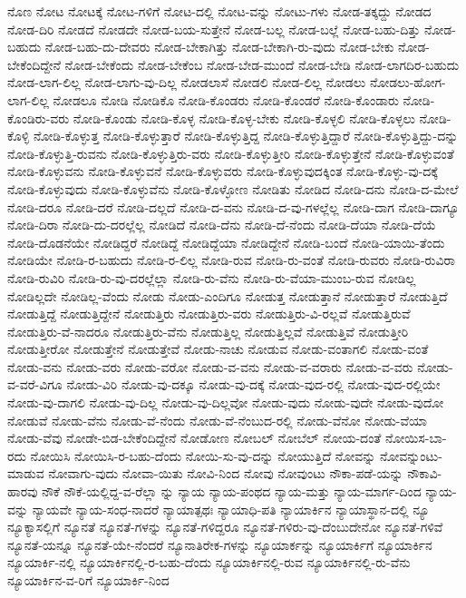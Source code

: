 {ನೊಣ
ನೋಟ
ನೋಟಕ್ಕೆ
ನೋಟ-ಗಳಿಗೆ
ನೋಟ-ದಲ್ಲಿ
ನೋಟ-ವನ್ನು
ನೋಟು-ಗಳು
ನೋಡ-ತಕ್ಕದ್ದು
ನೋಡದ
ನೋಡ-ದಿರಿ
ನೋಡದೆ
ನೋಡದೇ
ನೋಡ-ಬಯ-ಸುತ್ತೇನೆ
ನೋಡ-ಬಲ್ಲ
ನೋಡ-ಬಲ್ಲೆ
ನೋಡ-ಬಹು-ದಿತ್ತು
ನೋಡ-ಬಹುದು
ನೋಡ-ಬಹು-ದು-ದೇವರು
ನೋಡ-ಬೇಕಾಗಿತ್ತು
ನೋಡ-ಬೇಕಾಗಿ-ರು-ವುದು
ನೋಡ-ಬೇಕು
ನೋಡ-ಬೇಕೆಂದಿದ್ದೇನೆ
ನೋಡ-ಬೇಕೆಂದು
ನೋಡ-ಬೇಕೆಂಬ
ನೋಡ-ಬೇಡ-ಮುಂದೆ
ನೋಡ-ಬೇಡಿ
ನೋಡ-ಲಾಗದಿರ-ಬಹುದು
ನೋಡ-ಲಾಗ-ಲಿಲ್ಲ
ನೋಡ-ಲಾಗು-ವು-ದಿಲ್ಲ
ನೋಡಲಾಸೆ
ನೋಡಲಿ
ನೋಡ-ಲಿಲ್ಲ
ನೋಡಲು
ನೋಡಲು-ಹೋಗ-ಲಾಗ-ಲಿಲ್ಲ
ನೋಡಲೂ
ನೋಡಿ
ನೋಡಿಕೊ
ನೋಡಿ-ಕೊಂಡರು
ನೋಡಿ-ಕೊಂಡರೆ
ನೋಡಿ-ಕೊಂಡಾರು
ನೋಡಿ-ಕೊಂಡಿರು-ವರು
ನೋಡಿ-ಕೊಂಡು
ನೋಡಿ-ಕೊಳ್ಳ
ನೋಡಿ-ಕೊಳ್ಳ-ಬೇಕು
ನೋಡಿ-ಕೊಳ್ಳಲಿ
ನೋಡಿ-ಕೊಳ್ಳಲು
ನೋಡಿ-ಕೊಳ್ಳಿ
ನೋಡಿ-ಕೊಳ್ಳುತ್ತ
ನೋಡಿ-ಕೊಳ್ಳುತ್ತಾರೆ
ನೋಡಿ-ಕೊಳ್ಳುತ್ತಿದ್ದ
ನೋಡಿ-ಕೊಳ್ಳುತ್ತಿದ್ದಾರೆ
ನೋಡಿ-ಕೊಳ್ಳುತ್ತಿದ್ದು-ದನ್ನು
ನೋಡಿ-ಕೊಳ್ಳುತ್ತಿ-ರುವನು
ನೋಡಿ-ಕೊಳ್ಳುತ್ತಿರು-ವರು
ನೋಡಿ-ಕೊಳ್ಳುತ್ತೀರಿ
ನೋಡಿ-ಕೊಳ್ಳುತ್ತೇನೆ
ನೋಡಿ-ಕೊಳ್ಳುವಂತೆ
ನೋಡಿ-ಕೊಳ್ಳುವನು
ನೋಡಿ-ಕೊಳ್ಳುವನೆ
ನೋಡಿ-ಕೊಳ್ಳುವರು
ನೋಡಿ-ಕೊಳ್ಳುವುದಕ್ಕಿಂತ
ನೋಡಿ-ಕೊಳ್ಳು-ವು-ದಕ್ಕೆ
ನೋಡಿ-ಕೊಳ್ಳುವುದು
ನೋಡಿ-ಕೊಳ್ಳುವೆನು
ನೋಡಿ-ಕೊಳ್ಳೋಣ
ನೋಡಿತು
ನೋಡಿದ
ನೋಡಿ-ದನು
ನೋಡಿ-ದ-ಮೇಲೆ
ನೋಡಿ-ದರೂ
ನೋಡಿ-ದರೆ
ನೋಡಿ-ದಲ್ಲದೆ
ನೋಡಿ-ದ-ವನು
ನೋಡಿ-ದ-ವು-ಗಳಲ್ಲೆಲ್ಲ
ನೋಡಿ-ದಾಗ
ನೋಡಿ-ದಾಗ್ಯೂ
ನೋಡಿ-ದಿರಾ
ನೋಡಿ-ದು-ದರಲ್ಲೆಲ್ಲ
ನೋಡಿದೆ
ನೋಡಿ-ದೆನು
ನೋಡಿ-ದೆ-ನೆಂದು
ನೋಡಿ-ದೆಯಾ
ನೋಡಿ-ದೆಯೆ
ನೋಡಿ-ದೊಡನೆಯೇ
ನೋಡಿದ್ದರೆ
ನೋಡಿದ್ದೆ
ನೋಡಿದ್ದೆಯಾ
ನೋಡಿದ್ದೇನೆ
ನೋಡಿ-ಬಂದೆ
ನೋಡಿ-ಯಾಯಿ-ತೆಂದು
ನೋಡಿಯೇ
ನೋಡಿ-ರ-ಬಹುದು
ನೋಡಿ-ರ-ಲಿಲ್ಲ
ನೋಡಿ-ರುವ
ನೋಡಿ-ರು-ವಂತೆ
ನೋಡಿ-ರುವರು
ನೋಡಿ-ರುವಿರಾ
ನೋಡಿ-ರುವಿರಿ
ನೋಡಿ-ರು-ವು-ದರಲ್ಲೆಲ್ಲಾ
ನೋಡಿ-ರು-ವೆನು
ನೋಡಿ-ರು-ವೆಯಾ-ಮುಂಬ-ರುವ
ನೋಡಿಲ್ಲ
ನೋಡಿಲ್ಲದೇ
ನೋಡಿಲ್ಲ-ವೆಂದು
ನೋಡು
ನೋಡು-ಎಂದಿಗೂ
ನೋಡುತ್ತ
ನೋಡುತ್ತಾನೆ
ನೋಡುತ್ತಾರೆ
ನೋಡುತ್ತಿದೆ
ನೋಡುತ್ತಿದ್ದೆ
ನೋಡುತ್ತಿದ್ದೇನೆ
ನೋಡುತ್ತಿರು
ನೋಡುತ್ತಿರು-ವರು
ನೋಡುತ್ತಿರು-ವಿ-ರಲ್ಲವೆ
ನೋಡುತ್ತಿರುವೆ
ನೋಡುತ್ತಿರು-ವೆ-ನಾದರೂ
ನೋಡುತ್ತಿರು-ವೆನು
ನೋಡುತ್ತಿಲ್ಲ
ನೋಡುತ್ತಿಲ್ಲವೆ
ನೋಡುತ್ತಿವೆ
ನೋಡುತ್ತೀರಿ
ನೋಡುತ್ತೀರೋ
ನೋಡುತ್ತೇನೆ
ನೋಡುತ್ತೇವೆ
ನೋಡು-ನಾಚು
ನೋಡುವ
ನೋಡು-ವಂತಾಗಲಿ
ನೋಡು-ವಂತೆ
ನೋಡು-ವನು
ನೋಡು-ವರು
ನೋಡು-ವರೋ
ನೋಡು-ವ-ವನು
ನೋಡು-ವ-ವರಾರು
ನೋಡು-ವ-ವರು
ನೋಡು-ವ-ವರೆ-ವಿಗೂ
ನೋಡು-ವಿರಿ
ನೋಡು-ವು-ದಕ್ಕೂ
ನೋಡು-ವು-ದಕ್ಕೆ
ನೋಡು-ವುದ-ರಲ್ಲಿ
ನೋಡು-ವುದ-ರಲ್ಲಿಯೇ
ನೋಡು-ವು-ದಾಗಲಿ
ನೋಡು-ವು-ದಿಲ್ಲ
ನೋಡು-ವು-ದಿಲ್ಲವೋ
ನೋಡು-ವುದು
ನೋಡು-ವುದೇ
ನೋಡು-ವುದೋ
ನೋಡುವೆ
ನೋಡು-ವೆನು
ನೋಡು-ವೆ-ನೆಂದು
ನೋಡು-ವೆ-ನೆಂಬುದ-ರಲ್ಲಿ
ನೋಡು-ವೆನೋ
ನೋಡು-ವೆಯಾ
ನೋಡು-ವೆವು
ನೋಡೇ-ಬಿಡ-ಬೇಕೆಂದಿದ್ದೇನೆ
ನೋಡೋಣ
ನೋಬಲ್
ನೋಬೆಲ್
ನೋಯ-ದಂತೆ
ನೋಯಿಸ-ಬಾ-ರದು
ನೋಯಿಸಿ
ನೋಯಿಸಿ-ರ-ಬಹು-ದೆಂದು
ನೋಯಿ-ಸು-ವು-ದನ್ನು
ನೋಯುತ್ತಿದೆ
ನೋವನ್ನು
ನೋವನ್ನುಂಟು-ಮಾಡುವ
ನೋವಾಗು-ವುದು
ನೋವಾ-ಯಿತು
ನೋವಿ-ನಿಂದ
ನೋವು
ನೋವುಂಟು
ನೌಕಾ-ಪಡೆ-ಯನ್ನು
ನೌಕಾವಿ-ಹಾರವು
ನೌಕೆ
ನೌಕೆ-ಯಲ್ಲಿದ್ದ-ವ-ರೆಲ್ಲಾ
ನ್ನು
ನ್ಯಾಯ
ನ್ಯಾಯ-ಪಂಥದ
ನ್ಯಾಯ-ಮತ್ತು
ನ್ಯಾಯ-ಮಾರ್ಗ-ದಿಂದ
ನ್ಯಾಯ-ವನ್ನು
ನ್ಯಾಯವೇ
ನ್ಯಾಯ-ಸಂಧ-ನಾದರೆ
ನ್ಯಾಯಾತ್ಪಥಃ
ನ್ಯಾಯಾಧಿ-ಪತಿ
ನ್ಯಾಯಾರ್ಕಿನ
ನ್ಯಾಯಾಸ್ಥಾನ-ದಲ್ಲಿ
ನ್ಯೂ
ನ್ಯೂಕ್ಯಾಸಲ್ಲಿಗೆ
ನ್ಯೂನತೆ
ನ್ಯೂನತೆ-ಗಳನ್ನು
ನ್ಯೂನತೆ-ಗಳಿದ್ದರೂ
ನ್ಯೂನತೆ-ಗಳಿರು-ವು-ದೆಂಬುದೇನೋ
ನ್ಯೂನತೆ-ಗಳಿವೆ
ನ್ಯೂನತೆ-ಯನ್ನೂ
ನ್ಯೂನತೆ-ಯೇ-ನೆಂದರೆ
ನ್ಯೂನಾತಿರೇಕ-ಗಳನ್ನು
ನ್ಯೂಯಾರ್ಕನ್ನು
ನ್ಯೂಯಾರ್ಕಿಗೆ
ನ್ಯೂಯಾರ್ಕಿನ
ನ್ಯೂಯಾರ್ಕಿ-ನಲ್ಲಿ
ನ್ಯೂಯಾರ್ಕಿನಲ್ಲಿ-ರ-ಬಹು-ದೆಂದು
ನ್ಯೂಯಾರ್ಕಿನಲ್ಲಿ-ರುವ
ನ್ಯೂಯಾರ್ಕಿನಲ್ಲಿ-ರು-ವೆನು
ನ್ಯೂಯಾರ್ಕಿನ-ವ-ರಿಗೆ
ನ್ಯೂಯಾರ್ಕಿ-ನಿಂದ
}
